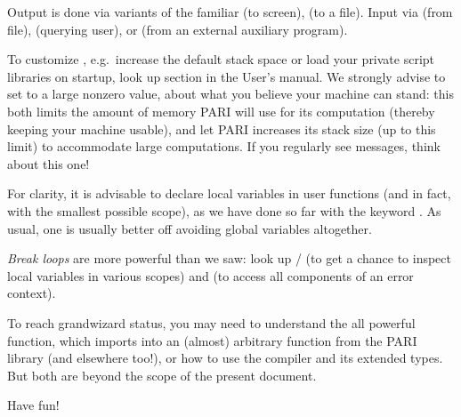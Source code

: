 Output is done via variants of the familiar  (to screen),
 (to a file). Input via  (from file), 
(querying user), or  (from an external auxiliary program).

To customize , e.g.~increase the default stack space or load your
private script libraries on startup, look up 
section in the User's manual. We strongly advise to set  to
a large nonzero value, about what you believe your machine can stand: this
both limits the amount of memory PARI will use for its computation (thereby
keeping your machine usable), and let PARI increases its stack size (up to
this limit) to accommodate large computations. If you regularly see  messages, think about this one!

For clarity, it is advisable  to declare local variables in user functions
(and in fact, with the smallest possible scope), as we have done so far with
the keyword . As usual, one is usually better off avoiding global
variables altogether.

\emph{Break loops} are more powerful than we saw: look up  /
 (to get a chance to inspect local variables in various scopes)
and  (to access all components of an error context).

To reach grandwizard status, you may need to understand the all powerful
 function, which imports into  an (almost) arbitrary
function from the PARI library (and elsewhere too!), or how to use the
 compiler and its extended types. But both are beyond the scope of
the present document.

Have fun!
\bye
